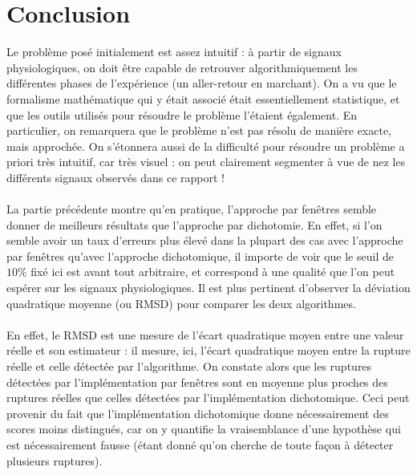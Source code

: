 \documentclass[french,11pt,notitlepage]{report}
\begin{document}
		
	
	\chapter{Conclusion}
	
	
	
	Le problème posé initialement est assez intuitif : à partir de signaux physiologiques, on doit être capable de retrouver algorithmiquement les différentes phases de l'expérience (un aller-retour en marchant). On a vu que le formalisme mathématique qui y était associé était essentiellement statistique, et que les outils utilisés pour résoudre le problème l'étaient également. En particulier, on remarquera que le problème n'est pas résolu de manière exacte, mais approchée. On s'étonnera aussi de la difficulté pour résoudre un problème a priori très intuitif, car très visuel : on peut clairement segmenter à vue de nez les différents signaux observés dans ce rapport !
	\\ \\
	La partie précédente montre qu'en pratique, l'approche par fenêtres semble donner de meilleurs résultats que l'approche par dichotomie. En effet, si l'on semble avoir un taux d'erreurs plus élevé dans la plupart des cas avec l'approche par fenêtres qu'avec l'approche dichotomique, il importe de voir que le seuil de $10\%$ fixé ici est avant tout arbitraire, et correspond à une qualité que l'on peut espérer sur les signaux physiologiques. Il est plus pertinent d'observer la déviation quadratique moyenne (ou RMSD) pour comparer les deux algorithmes.
	\\ \\
	En effet, le RMSD est une mesure de l'écart quadratique moyen entre une valeur réelle et son estimateur : il mesure, ici, l'écart quadratique moyen entre la rupture réelle et celle détectée par l'algorithme. On constate alors que les ruptures détectées par l'implémentation par fenêtres sont en moyenne plus proches des ruptures réelles que celles détectées par l'implémentation dichotomique. Ceci peut provenir du fait que l'implémentation dichotomique donne nécessairement des scores moins distingués, car on y quantifie la vraisemblance d'une hypothèse qui est nécessairement fausse (étant donné qu'on cherche de toute façon à détecter plusieurs ruptures).
	


	
\end{document}
